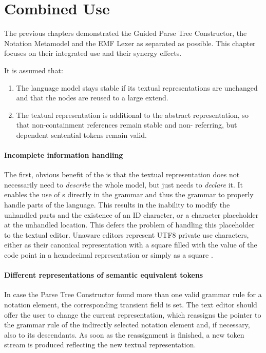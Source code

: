 \section{Combined Use}

The previous chapters  demonstrated the Guided Parse Tree Constructor, the Notation Metamodel and the EMF Lexer as separated as possible. This chapter focuses on their integrated use and their synergy effects. 

It is assumed that:
\begin{enumerate}
	\item The language model stays stable if its textual representations are unchanged and that the nodes are reused to a large extend.
	\item The textual representation is additional to the abstract representation, so that non-containment references remain stable and non- referring, but  dependent sentential tokens remain valid.
\end{enumerate}


\paragraph{Incomplete information handling}
The first, obvious benefit of the  is that the textual representation does not necessarily need to \emph{describe} the whole model, but just needs to \emph{declare} it. It enables the use of s directly in the grammar and thus the grammar to properly handle parts of the language. This results in the inability to modify the unhandled parts and the existence of an ID character, or a character placeholder at the unhandled location. This defers the problem of handling this placeholder to the textual editor. Unaware editors represent UTF8 private use characters, either as their canonical representation with a square filled with the value of the code point in a hexadecimal representation or simply as a square \code{$\square$}.

\paragraph{Different representations of semantic equivalent tokens}
In case the Parse Tree Constructor found more than one valid grammar rule for a notation element, the corresponding transient field is set. The text editor should offer the user to change the current representation, which reassigns the pointer to the grammar rule of the indirectly selected notation element and, if necessary, also to its descendants. As soon as the reassignment is finished, a new token stream is produced reflecting the new textual representation.


